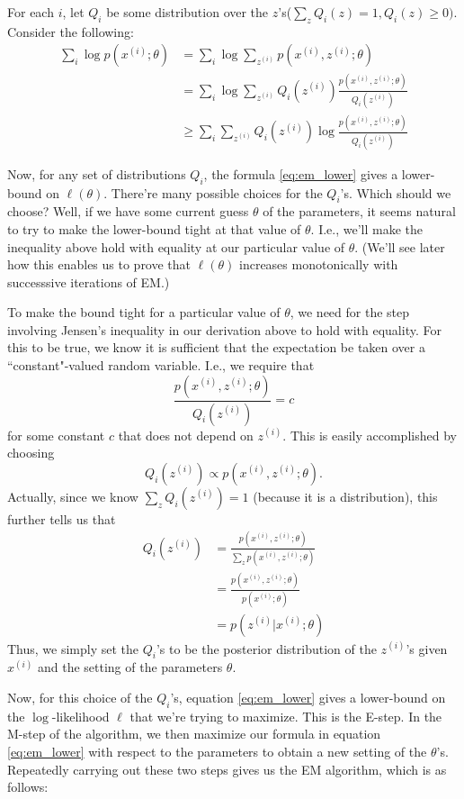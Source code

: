     For each $i$, let $Q_i$ be some distribution over the $z$'s($\sum_{z}{Q_{i}{(z)} = 1}, Q_i(z) \ge 0)$.
Consider the following:
\begin{align}
    \sum\limits_{i}{\log p(x^{(i)}; \theta)}
        &= \sum\limits_{i}{\log \sum\limits_{z^{(i)}}{p(x^{(i)}, z^{(i)}; \theta)} } \\
        &= \sum\limits_{i}{\log \sum\limits_{z^{(i)}}{Q_i(z^{(i)}) \frac{p(x^{(i)}, z^{(i)}; \theta)}{Q_i(z^{(i)})}}} \\
        &\ge \sum\limits_{i}{\sum\limits_{z^{(i)}}{Q_i(z^{(i)}) \log\frac{p(x^{(i)}, z^{(i)}; \theta)}{Q_i(z^{(i)})}}} \label{eq:em_lower}
\end{align}

    Now, for any set of distributions $Q_i$, the formula \ref{eq:em_lower} gives a lower-bound on $\ell(\theta)$.
There're many possible choices for the $Q_i$'s. Which should we choose?  Well, if we have some current guess
$\theta$ of the parameters, it seems natural to try to make the lower-bound tight at that value of $\theta$.
I.e., we'll make the inequality above hold with equality at our particular value of $\theta$.
(We'll see later how this enables us to prove that $\ell(\theta)$ increases monotonically with
successsive iterations of EM.)

    To make the bound tight for a particular value of $\theta$, we need for the step involving Jensen's
inequality in our derivation above to hold with equality. For this to be true, we know it is sufficient
that the expectation be taken over a ``constant"-valued random variable. I.e., we require that
\[
    \frac{p(x^{(i)},z^{(i)};\theta)}{Q_i(z^{(i)})}=c
\]
for some constant $c$ that does not depend on $z^{(i)}$. This is easily accomplished by choosing
\[
    Q_i(z^{(i)}) \propto p(x^{(i)}, z^{(i)}; \theta).
\]
Actually, since we know $\sum_{z}{Q_i(z^{(i)})} = 1$ (because it is a distribution), this further tells us that
\begin{align*}
    Q_i(z^{(i)}) &= \frac{p(x^{(i)},z^{(i)}; \theta)}{\sum_{z}{p(x^{(i)},z^{(i)};\theta)}} \\
                 &= \frac{p(x^{(i)},z^{(i)}; \theta)}{p(x^{(i)};\theta)} \\
                 &= p(z^{(i)} | x^{(i)}; \theta)
\end{align*}
Thus, we simply set the $Q_i$'s to be the posterior distribution of the $z^{(i)}$'s given $x^{(i)}$ and the setting of the parameters $\theta$.

    Now, for this choice of the $Q_i$'s, equation \ref{eq:em_lower} gives a lower-bound on the
$\log$-likelihood $\ell$ that we're trying to maximize. This is the E-step.
In the M-step of the algorithm, we then maximize our formula
in equation \ref{eq:em_lower} with respect to the parameters to obtain a new setting of the $\theta$'s.
Repeatedly carrying out these two steps gives us the EM algorithm, which is as follows:

